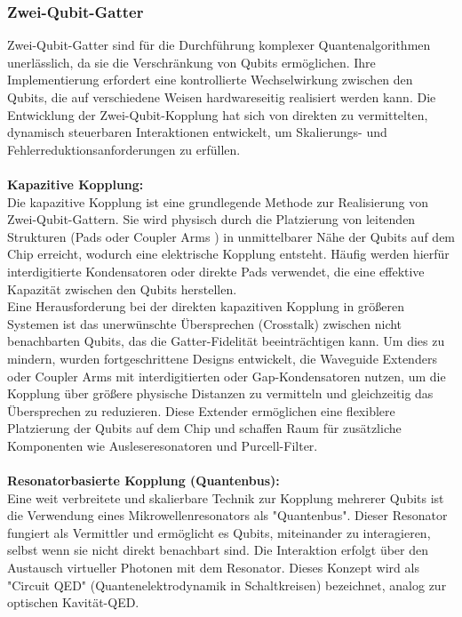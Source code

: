 \subsubsection{Zwei-Qubit-Gatter}
Zwei-Qubit-Gatter sind für die Durchführung komplexer Quantenalgorithmen unerlässlich, da sie die Verschränkung von Qubits ermöglichen. Ihre Implementierung erfordert eine kontrollierte Wechselwirkung zwischen den Qubits, die auf verschiedene Weisen hardwareseitig realisiert werden kann. Die Entwicklung der Zwei-Qubit-Kopplung hat sich von direkten zu vermittelten, dynamisch steuerbaren Interaktionen entwickelt, um Skalierungs- und Fehlerreduktionsanforderungen zu erfüllen.\\\\
\textbf{Kapazitive Kopplung:}\\
Die kapazitive Kopplung ist eine grundlegende Methode zur Realisierung von Zwei-Qubit-Gattern. Sie wird physisch durch die Platzierung von leitenden Strukturen (Pads oder \grqq{}Coupler Arms\grqq{} ) in unmittelbarer Nähe der Qubits auf dem Chip erreicht, wodurch eine elektrische Kopplung entsteht. Häufig werden hierfür interdigitierte Kondensatoren oder direkte Pads verwendet, die eine effektive Kapazität zwischen den Qubits herstellen.\\
Eine Herausforderung bei der direkten kapazitiven Kopplung in größeren Systemen ist das unerwünschte Übersprechen (Crosstalk) zwischen nicht benachbarten Qubits, das die Gatter-Fidelität beeinträchtigen kann. Um dies zu mindern, wurden fortgeschrittene Designs entwickelt, die \grqq{}Waveguide Extenders\grqq{} oder \grqq{}Coupler Arms\grqq{} mit interdigitierten oder Gap-Kondensatoren nutzen, um die Kopplung über größere physische Distanzen zu vermitteln und gleichzeitig das Übersprechen zu reduzieren. Diese Extender ermöglichen eine flexiblere Platzierung der Qubits auf dem Chip und schaffen Raum für zusätzliche Komponenten wie Ausleseresonatoren und Purcell-Filter.
\\\\
\textbf{Resonatorbasierte Kopplung (Quantenbus):}\\
Eine weit verbreitete und skalierbare Technik zur Kopplung mehrerer Qubits ist die Verwendung eines Mikrowellenresonators als "Quantenbus". Dieser Resonator fungiert als Vermittler und ermöglicht es Qubits, miteinander zu interagieren, selbst wenn sie nicht direkt benachbart sind. Die Interaktion erfolgt über den Austausch virtueller Photonen mit dem Resonator. Dieses Konzept wird als "Circuit QED" (Quantenelektrodynamik in Schaltkreisen) bezeichnet, analog zur optischen Kavität-QED.\\
